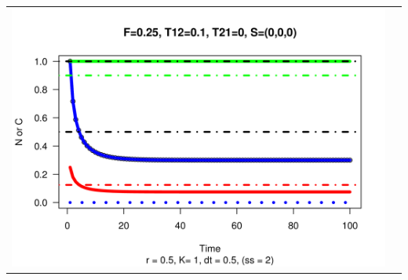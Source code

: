 \documentclass[a4paper,KOMA,landscape,titlepage]{powersem}
\begin{document}
\begin{slide}
\begin{center}
\begin{tabular}{cc}
\includegraphics[height=0.35\textheight]{./graphics/r05F025T1201T210S000.png}\\
\end{tabular}
\end{center}
\end{slide}
\end{document}
